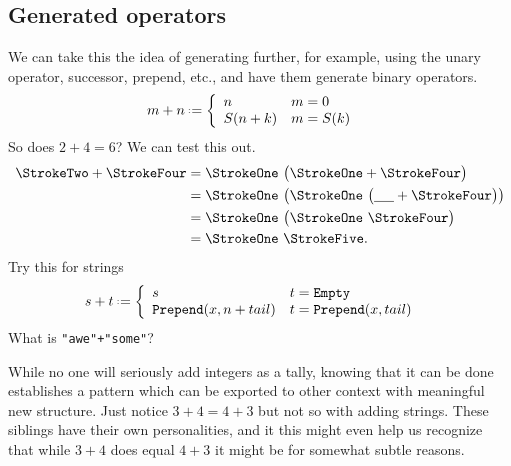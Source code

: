 \subsection{Generated operators}
We can take this the idea of generating further, for example, using 
the unary operator, successor, prepend, etc., and have them generate 
binary operators.
\begin{align*}
    m+n & \defeq\left\{ 
    \begin{array}{ll}
        n & m = 0\\
        S(n+k) & m=S(k)
    \end{array}
    \right.
\end{align*}
So does $2+4=6$?  We can test this out.
\begin{align*}
    \text{\StrokeTwo}+\text{\StrokeFour} & = \text{\StrokeOne}~ \big(\text{\StrokeOne} +\text{\StrokeFour}\big)\\
    & = \text{\StrokeOne}~ \big( \text{\StrokeOne}~\big(\underline{\hspace{5mm}}+\StrokeFour\big)\big)\\
    & = \text{\StrokeOne}~ \big( \text{\StrokeOne}~\StrokeFour\big)\\
    & = \text{\StrokeOne}~ \text{\StrokeFive}.
\end{align*}
Try this for strings
\begin{align*}
    s+t & \defeq\left\{ 
    \begin{array}{ll}
        s & t = \texttt{Empty}\\
        \texttt{Prepend}(x,n+tail) & t=\texttt{Prepend}(x,tail)
    \end{array}
    \right.
\end{align*}
What is \lstinline{"awe"+"some"}?  

While no one will seriously add integers as a tally, 
knowing that it can be done establishes a pattern which can be exported to other context
with meaningful new structure.  Just notice $3+4=4+3$ but not so with adding strings.
These siblings have their own personalities, and it this might even help us recognize 
that while $3+4$ does equal $4+3$ it might be for somewhat subtle reasons.

